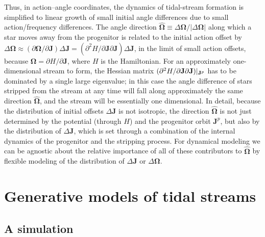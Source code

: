 \documentclass{emulateapj}
\renewcommand{\vec}[1]{\ensuremath{\mathbf{#1}}}
\newcommand{\unitvec}[1]{\ensuremath{\mathbf{\hat{#1}}}}
\newcommand{\vecj}{\ensuremath{\vec{J}}}
\newcommand{\veco}{\ensuremath{\vec{\Omega}}}
\begin{document}
Thus, in action--angle coordinates, the dynamics of tidal-stream
formation is simplified to linear growth of small initial angle
differences due to small action/frequency differences. The angle
direction $\unitvec{\veco} \equiv \Delta \veco / | \Delta \veco|$
along which a star moves away from the progenitor is related to the
initial action offset by $\Delta \veco \approx (\partial \veco /
\partial \vecj) \Delta \vecj = (\partial^2 H / \partial \vecj \partial
\vecj) \Delta \vecj$, in the limit of small action offsets, because
$\veco = \partial H / \partial \vecj$, where $H$ is the
Hamiltonian. For an approximately one-dimensional stream to form, the
Hessian matrix $(\partial^2 H / \partial \vecj \partial
\vecj)\large|_{\vecj^p}$ has to be dominated by a single large
eigenvalue; in this case the angle difference of stars stripped from
the stream at any time will fall along approximately the same
direction $\unitvec\veco$, and the stream will be essentially one
dimensional. In detail, because the distribution of initial offsets
$\Delta \vecj$ is not isotropic, the direction $\unitvec \veco$ is not
just determined by the potential (through $H$) and the progenitor
orbit $\vecj^p$, but also by the distribution of $\Delta \vecj$, which
is set through a combination of the internal dynamics of the
progenitor and the stripping process. For dynamical modeling we can be
agnostic about the relative importance of all of these contributors to
$\unitvec \veco$ by flexible modeling of the distribution of $\Delta
\vecj$ or $\Delta \veco$.


\section{Generative models of tidal streams}\label{sec:generative}

\subsection{A simulation}\label{sec:sim}
\end{document}

